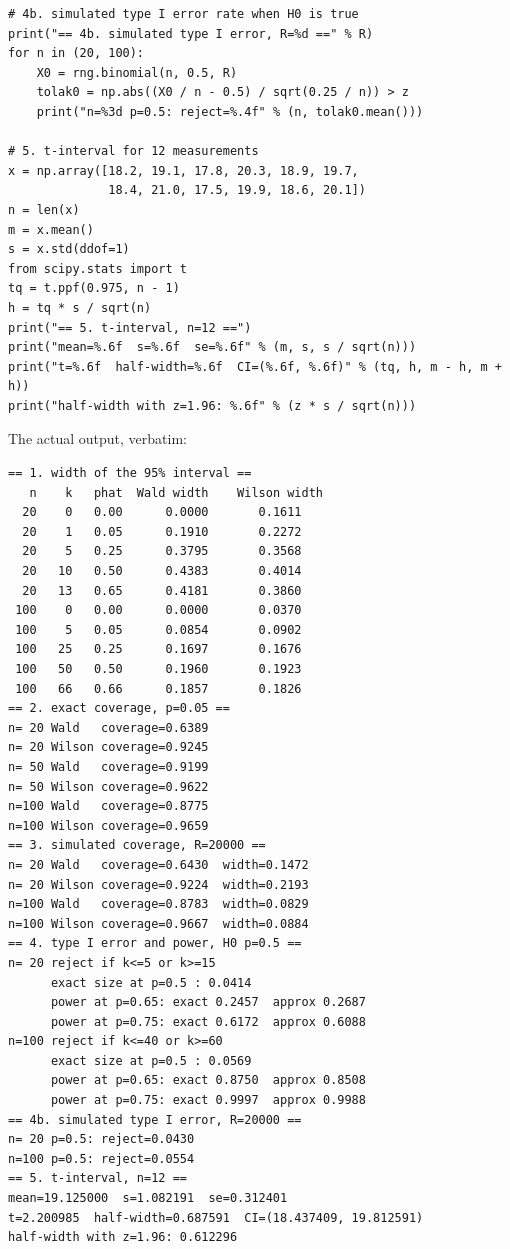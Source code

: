 \begin{lab}
\begin{verbatim}
# 4b. simulated type I error rate when H0 is true
print("== 4b. simulated type I error, R=%d ==" % R)
for n in (20, 100):
    X0 = rng.binomial(n, 0.5, R)
    tolak0 = np.abs((X0 / n - 0.5) / sqrt(0.25 / n)) > z
    print("n=%3d p=0.5: reject=%.4f" % (n, tolak0.mean()))

# 5. t-interval for 12 measurements
x = np.array([18.2, 19.1, 17.8, 20.3, 18.9, 19.7,
              18.4, 21.0, 17.5, 19.9, 18.6, 20.1])
n = len(x)
m = x.mean()
s = x.std(ddof=1)
from scipy.stats import t
tq = t.ppf(0.975, n - 1)
h = tq * s / sqrt(n)
print("== 5. t-interval, n=12 ==")
print("mean=%.6f  s=%.6f  se=%.6f" % (m, s, s / sqrt(n)))
print("t=%.6f  half-width=%.6f  CI=(%.6f, %.6f)" % (tq, h, m - h, m + h))
print("half-width with z=1.96: %.6f" % (z * s / sqrt(n)))
\end{verbatim}
\end{lab}

The actual output, verbatim:

\begin{verbatim}
== 1. width of the 95% interval ==
   n    k   phat  Wald width    Wilson width
  20    0   0.00      0.0000       0.1611
  20    1   0.05      0.1910       0.2272
  20    5   0.25      0.3795       0.3568
  20   10   0.50      0.4383       0.4014
  20   13   0.65      0.4181       0.3860
 100    0   0.00      0.0000       0.0370
 100    5   0.05      0.0854       0.0902
 100   25   0.25      0.1697       0.1676
 100   50   0.50      0.1960       0.1923
 100   66   0.66      0.1857       0.1826
== 2. exact coverage, p=0.05 ==
n= 20 Wald   coverage=0.6389
n= 20 Wilson coverage=0.9245
n= 50 Wald   coverage=0.9199
n= 50 Wilson coverage=0.9622
n=100 Wald   coverage=0.8775
n=100 Wilson coverage=0.9659
== 3. simulated coverage, R=20000 ==
n= 20 Wald   coverage=0.6430  width=0.1472
n= 20 Wilson coverage=0.9224  width=0.2193
n=100 Wald   coverage=0.8783  width=0.0829
n=100 Wilson coverage=0.9667  width=0.0884
== 4. type I error and power, H0 p=0.5 ==
n= 20 reject if k<=5 or k>=15
      exact size at p=0.5 : 0.0414
      power at p=0.65: exact 0.2457  approx 0.2687
      power at p=0.75: exact 0.6172  approx 0.6088
n=100 reject if k<=40 or k>=60
      exact size at p=0.5 : 0.0569
      power at p=0.65: exact 0.8750  approx 0.8508
      power at p=0.75: exact 0.9997  approx 0.9988
== 4b. simulated type I error, R=20000 ==
n= 20 p=0.5: reject=0.0430
n=100 p=0.5: reject=0.0554
== 5. t-interval, n=12 ==
mean=19.125000  s=1.082191  se=0.312401
t=2.200985  half-width=0.687591  CI=(18.437409, 19.812591)
half-width with z=1.96: 0.612296
\end{verbatim}

